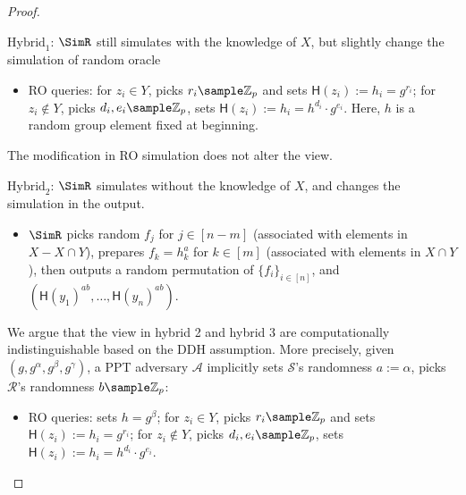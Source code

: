 \begin{proof}
\begin{trivlist}
\item $\text{Hybrid}_1$: $\SimR$ still simulates with the knowledge of $X$, 
    but slightly change the simulation of random oracle 
\begin{itemize}
    \item RO queries: for $z_i \in Y$, picks $r_i \sample \mathbb{Z}_p$ 
        and sets $\mathsf{H}(z_i):= h_i = g^{r_i}$; for $z_i \notin Y$, 
        picks $d_i, e_i \sample \mathbb{Z}_p$, sets $\mathsf{H}(z_i):= h_i = h^{d_i} \cdot g^{e_i}$. 
        Here, $h$ is a random group element fixed at beginning.              
\end{itemize}
The modification in RO simulation does not alter the view. 

\begin{center}
\end{center}

\item $\text{Hybrid}_2$: $\SimR$ simulates without the knowledge of $X$, 
    and changes the simulation in the output.  
\begin{itemize}
    \item $\SimR$ picks random $f_j$ for $j \in [n-m]$ (associated with elements in $X - X \cap Y$), 
        prepares $f_k = h_k^a$ for $k \in [m]$ (associated with elements in $X \cap Y$), 
        then outputs a random permutation of $\{f_i\}_{i \in [n]}$, 
        and $(\mathsf{H}(y_1)^{ab}, \dots, \mathsf{H}(y_n)^{ab})$.       
\end{itemize}
We argue that the view in hybrid 2 and hybrid 3 are computationally indistinguishable based on the DDH assumption. 
More precisely, given $(g, g^\alpha, g^\beta, g^\gamma)$, 
a PPT adversary $\mathcal{A}$  
implicitly sets $\mathcal{S}$'s randomness $a:=\alpha$, picks $\mathcal{R}$'s randomness $b \sample \mathbb{Z}_p$: 
\begin{itemize}
    \item RO queries: sets $h = g^\beta$; for $z_i \in Y$, picks $r_i \sample \mathbb{Z}_p$ 
        and sets $\mathsf{H}(z_i):= h_i = g^{r_i}$; for $z_i \notin Y$, 
        picks $d_i, e_i \sample \mathbb{Z}_p$, sets $\mathsf{H}(z_i):= h_i = h^{d_i} \cdot g^{e_i}$.  


\end{itemize}
\end{trivlist}
\end{proof}
